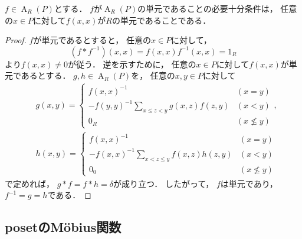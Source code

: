 \documentclass{jlreq}
\DeclareMathOperator{\IncidenceAlg}{A}
\newcommand{\UnitOfRing}[1]{1_{#1}}
\newcommand{\ZeroOfRing}[1]{0_{#1}}
\begin{document}
	\begin{proposition}\label{prop:incidence_alg_unit}
		$f \in \IncidenceAlg_R(P)$とする．
		$f$が$\IncidenceAlg_R(P)$の単元であることの必要十分条件は，
		任意の$x \in P$に対して$f(x, x)$が$R$の単元であることである．
	\end{proposition}
	
	\begin{proof}
		$f$が単元であるとすると，
		任意の$x \in P$に対して，
		\begin{equation}
			(f \ast f^{-1})(x, x)
			= f(x, x) f^{-1}(x, x)
			= \UnitOfRing{R}
		\end{equation}
		より$f(x, x) \ne 0$が従う．
		逆を示すために，
		任意の$x \in P$に対して$f(x, x)$が単元であるとする．
		$g, h \in \IncidenceAlg_R(P)$を，
		任意の$x, y \in P$に対して
		\begin{align}
			&g(x, y)
			= \begin{cases}
				{f(x, x)}^{-1} & (x = y) \\
				-{f(y, y)}^{-1} \sum_{x \le z < y} g(x, z) f(z, y) & (x < y) \\
				\ZeroOfRing{R} & (x \nleq y)
			\end{cases}, \\
			&h(x, y)
			= \begin{cases}
				{f(x, x)}^{-1} & (x = y) \\
				-{f(x, x)}^{-1} \sum_{x < z \le y} f(x, z) h(z, y) & (x < y) \\
				\ZeroOfRing{0} & (x \nleq y)
			\end{cases}
		\end{align}
		で定めれば，
		$g \ast f = f \ast h = \delta$が成り立つ．
		したがって，
		$f$は単元であり，
		$f^{-1} = g = h$である．
	\end{proof}
	
	\subsection{posetのMöbius関数}
	
\end{document}
